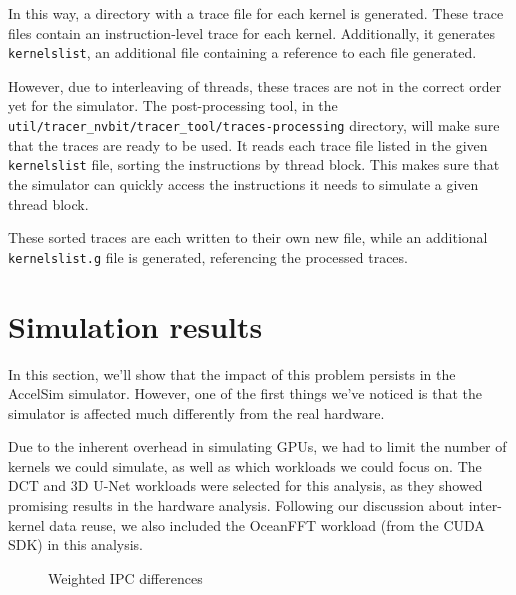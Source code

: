 In this way, a directory with a trace file for each kernel is generated.
These trace files contain an instruction-level trace for each kernel.
Additionally, it generates \verb|kernelslist|, an additional file containing a reference to each file generated.

However, due to interleaving of threads, these traces are not in the correct order yet for the simulator.
The post-processing tool, in the \verb|util/tracer_nvbit/tracer_tool/traces-processing| directory, will make sure that the traces are ready to be used.
It reads each trace file listed in the given \verb|kernelslist| file, sorting the instructions by thread block.
This makes sure that the simulator can quickly access the instructions it needs to simulate a given thread block.

These sorted traces are each written to their own new file, while an additional \verb|kernelslist.g| file is generated, referencing the processed traces.

\FloatBarrier
\section{Simulation results}\label{sec:simulation-results}
In this section, we'll show that the impact of this problem persists in the AccelSim simulator.
However, one of the first things we've noticed is that the simulator is affected much differently from the real hardware.

Due to the inherent overhead in simulating GPUs, we had to limit the number of kernels we could simulate, as well as which workloads we could focus on.
The DCT and 3D U-Net workloads were selected for this analysis, as they showed promising results in the hardware analysis.
Following our discussion about inter-kernel data reuse, we also included the OceanFFT workload (from the CUDA SDK) in this analysis.

\begin{figure}[ht]
    \centering
    \begin{minipage}[c]{0.45\textwidth}
        \resizebox{\textwidth}{!}{}
    \end{minipage}
    \begin{minipage}[c]{0.45\textwidth}
        \resizebox{\textwidth}{!}{}
    \end{minipage}
    \caption{Weighted IPC differences}
    \label{fig:sim_ipc_diff}
\end{figure}

